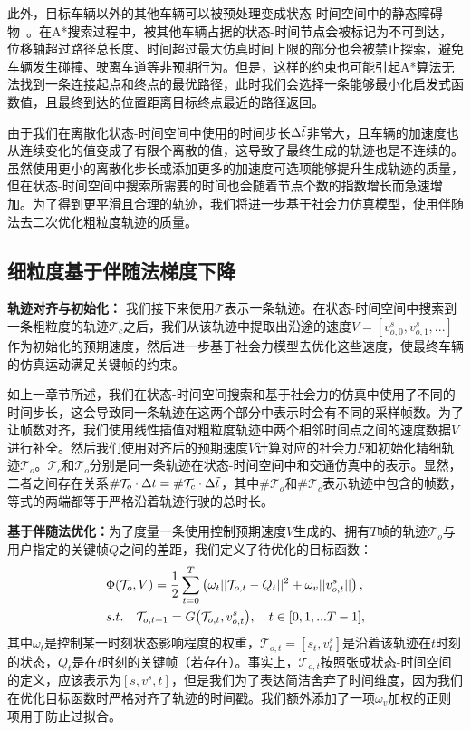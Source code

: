 此外，目标车辆以外的其他车辆可以被预处理变成状态-时间空间中的静态障碍物~\cite{sewall2010virtualized}。在A*搜索过程中，被其他车辆占据的状态-时间节点会被标记为不可到达，位移轴超过路径总长度、时间超过最大仿真时间上限的部分也会被禁止探索，避免车辆发生碰撞、驶离车道等非预期行为。但是，这样的约束也可能引起A*算法无法找到一条连接起点和终点的最优路径，此时我们会选择一条能够最小化启发式函数值，且最终到达的位置距离目标终点最近的路径返回。

由于我们在离散化状态-时间空间中使用的时间步长$\Delta \Tilde{t}$非常大，且车辆的加速度也从连续变化的值变成了有限个离散的值，这导致了最终生成的轨迹也是不连续的。虽然使用更小的离散化步长或添加更多的加速度可选项能够提升生成轨迹的质量，但在状态-时间空间中搜索所需要的时间也会随着节点个数的指数增长而急速增加。为了得到更平滑且合理的轨迹，我们将进一步基于社会力仿真模型，使用伴随法去二次优化粗粒度轨迹的质量。


\subsection{细粒度基于伴随法梯度下降}
\label{section:keyframe_fineopt}

\textbf{轨迹对齐与初始化：}
我们接下来使用$\mathcal{T}$表示一条轨迹。在状态-时间空间中搜索到一条粗粒度的轨迹$\mathcal{T}_c$之后，我们从该轨迹中提取出沿途的速度$V=[v_{o,0}^s, v_{o,1}^s, ...]$作为初始化的预期速度，然后进一步基于社会力模型去优化这些速度，使最终车辆的仿真运动满足关键帧的约束。

如上一章节所述，我们在状态-时间空间搜索和基于社会力的仿真中使用了不同的时间步长，这会导致同一条轨迹在这两个部分中表示时会有不同的采样帧数。为了让帧数对齐，我们使用线性插值对粗粒度轨迹中两个相邻时间点之间的速度数据$V$进行补全。然后我们使用对齐后的预期速度$V$计算对应的社会力$F$和初始化精细轨迹$\mathcal{T}_o$。$\mathcal{T}_c$和$\mathcal{T}_o$分别是同一条轨迹在状态-时间空间中和交通仿真中的表示。显然，二者之间存在关系$\#\mathcal{T}_o \cdot \Delta{t} = \#\mathcal{T}_c \cdot \Delta{\Tilde{t}}$，其中$\#\mathcal{T}_o$和$\#\mathcal{T}_c$表示轨迹中包含的帧数，等式的两端都等于严格沿着轨迹行驶的总时长。



\textbf{基于伴随法优化：}为了度量一条使用控制预期速度$V$生成的、拥有$T$帧的轨迹$\mathcal{T}_o$与用户指定的关键帧$Q$之间的差距，我们定义了待优化的目标函数：
\begin{equation}
\setlength\abovedisplayskip{10pt}
\setlength\belowdisplayskip{10pt}
\label{eq:keyframe_adjobjective}
\begin{aligned}
    & \Phi(\mathcal{T}_o, V) = \frac{1}{2} \sum_{t=0}^T \left(  \omega_t || \mathcal{T}_{o,t} - Q_t ||^2 + \omega_v ||v^s_{o,t}|| \right), \\
    & s.t. \quad \mathcal{T}_{o,t+1} = G\big(\mathcal{T}_{o,t}, v^s_{o,t}\big), \quad t\in[0,1,...T-1],
\end{aligned}
\end{equation}
其中$\omega_t$是控制某一时刻状态影响程度的权重，$\mathcal{T}_{o,t} = [s_t, v^s_t]$是沿着该轨迹在$t$时刻的状态，$Q_t$是在$t$时刻的关键帧（若存在）。事实上，$\mathcal{T}_{o,t}$按照张成状态-时间空间的定义，应该表示为$[s, v^s, t]$，但是我们为了表达简洁舍弃了时间维度，因为我们在优化目标函数时严格对齐了轨迹的时间戳。我们额外添加了一项$\omega_v$加权的正则项用于防止过拟合。

